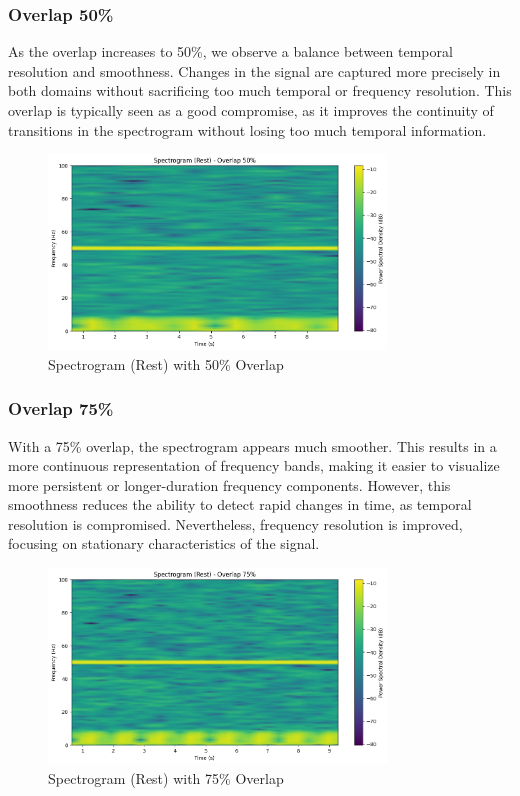 \documentclass[10pt]{article}
\theoremstyle{definition}
\theoremstyle{remark}
\theoremstyle{definition}
\numberwithin{equation}{prob}
\begin{document}
\subsubsection{Overlap 50\%}
As the overlap increases to 50\%, we observe a balance between temporal resolution and smoothness. Changes in the signal are captured more precisely in both domains without sacrificing too much temporal or frequency resolution. This overlap is typically seen as a good compromise, as it improves the continuity of transitions in the spectrogram without losing too much temporal information.

\begin{figure}[H]
    \centering
    \includegraphics[width=0.8\textwidth]{./figures/Spectrogram (Rest) - Overlap 50.png}
    \caption{Spectrogram (Rest) with 50\% Overlap}
    \label{fig:rest_50_overlap}
\end{figure}

\subsubsection{Overlap 75\%}
With a 75\% overlap, the spectrogram appears much smoother. This results in a more continuous representation of frequency bands, making it easier to visualize more persistent or longer-duration frequency components. However, this smoothness reduces the ability to detect rapid changes in time, as temporal resolution is compromised. Nevertheless, frequency resolution is improved, focusing on stationary characteristics of the signal.

\begin{figure}[H]
    \centering
    \includegraphics[width=0.8\textwidth]{./figures/Spectrogram (Rest) - Overlap 75.png}
    \caption{Spectrogram (Rest) with 75\% Overlap}
    \label{fig:rest_75_overlap}
\end{figure}
\end{document}
